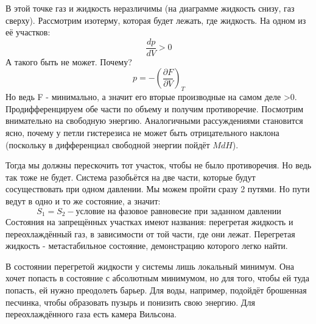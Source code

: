 \documentclass[a4paper, 12pt]{article}
\begin{document}
	В этой точке газ и жидкость неразличимы (на диаграмме жидкость снизу, газ сверху).  Рассмотрим изотерму, которая будет лежать, где жидкость. На одном из её участков:
	\begin{equation*}
		\frac{dp}{dV} > 0 
	\end{equation*}
	А такого быть не может. Почему? 
	\begin{equation*}	
		p = -(\frac{\partial F}{\partial V})_{T}
	\end{equation*}
	Но ведь F - минимально, а значит его вторые производные на самом деле >0. Продифференцируем обе части по объему и получим противоречие. Посмотрим внимательно на свободную энергию. Аналогичными рассуждениями становится ясно, почему у петли гистерезиса не может быть отрицательного наклона (поскольку в дифференциал свободной энергии пойдёт $MdH$).
	
	Тогда мы должны перескочить тот участок, чтобы не было противоречия. Но ведь так тоже не будет. Система разобьётся на две части, которые будут сосуществовать при одном давлении. Мы можем пройти сразу 2 путями. Но пути ведут в одно и то же состояние, а значит:
	\begin{equation*}
		S_{1} = S_{2} - \text{условие на фазовое равновесие при заданном давлении}
	\end{equation*}
	Состояния на запрещённых участках имеют названия: перегретая жидкость и переохлаждённый газ, в зависимости от той части, где они лежат. Перегретая жидкость - метастабильное состояние, демонстрацию которого легко найти.
	
	В состоянии перегретой жидкости у системы лишь локальный минимум. Она хочет попасть в состояние с абсолютным минимумом, но для того, чтобы ей туда попасть, ей нужно преодолеть барьер. Для воды, например, подойдёт брошенная песчинка, чтобы образовать пузырь и понизить свою энергию. Для переохлаждённого газа есть камера Вильсона.
\end{document}
